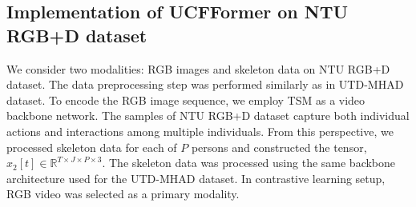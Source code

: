 \subsection{Implementation of UCFFormer on NTU RGB+D dataset}
We consider two modalities: RGB images and skeleton data on NTU RGB+D dataset. The data preprocessing step was performed similarly as in UTD-MHAD dataset. To encode the RGB image sequence, we employ TSM as a video backbone network. 
The samples of NTU RGB+D dataset capture both individual actions and interactions among multiple individuals. 
From this perspective, we processed skeleton data for each of $P$ persons and constructed the tensor, 
$x_{2}[t] \in \mathbb{R}^{T \times J \times P \times 3}$.
The skeleton data was processed using the same backbone architecture used for the UTD-MHAD dataset. In contrastive learning setup, RGB video was selected as a primary modality.
